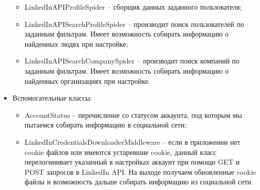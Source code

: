\begin{itemize}
\begin{itemize}
        \item LinkedInAPIProfileSpider -- сборщик данных заданного пользователя;
        \item LinkedInAPISearchProfileSpider -- производит поиск пользователей по заданным фильтрам. Имеет возможность 
        собирать информацию о найденных людях при настройке;
        \item LinkedInAPISearchCompanySpider -- производит поиск компаний по заданным фильтрам. Имеет возможность 
        собирать информацию о найденных организациях при настройке.
    \end{itemize}
    \item Вспомогательные классы:
    \begin{itemize}
        \item AccountStatus -- перечисление со статусом аккаунта, под которым мы пытаемся собирать информацию в социальной
        сети;
        \item LinkedInCredentialsDownloaderMiddleware -- если в приложении нет cookie файлов или имеются устаревшие cookie, 
        данный класс перелогинивает указанный в настройках аккаунт при помощи GET и POST запросов в LinkedIn API. На выходе
        получаем обновленные cookie файлы и возможность дальше собирать информацию из социальной сети. 
    \end{itemize}  
\end{itemize}